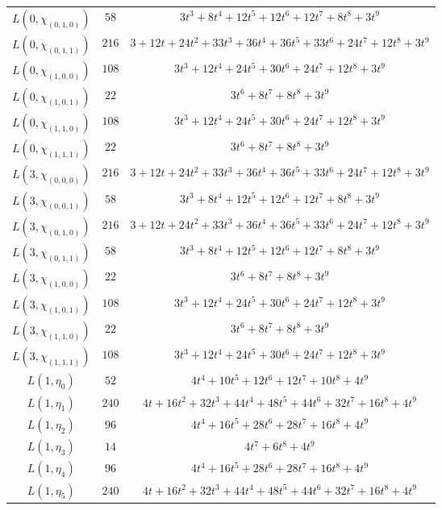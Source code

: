 \begin{center}
\begin{tabular}{c|c|c}
$L(0,\chi_{(0,1,0)})$ & $58$ & $3t^{3} + 8t^{4} + 12t^{5} + 12t^{6} + 12t^{7} + 8t^{8} + 3t^{9}$ \\
$L(0,\chi_{(0,1,1)})$ & $216$ & $3 + 12t + 24t^{2} + 33t^{3} + 36t^{4} + 36t^{5} + 33t^{6} + 24t^{7} + 12t^{8} + 3t^{9}$ \\
$L(0,\chi_{(1,0,0)})$ & $108$ & $3t^{3} + 12t^{4} + 24t^{5} + 30t^{6} + 24t^{7} + 12t^{8} + 3t^{9}$ \\
$L(0,\chi_{(1,0,1)})$ & $22$ & $3t^{6} + 8t^{7} + 8t^{8} + 3t^{9}$ \\
$L(0,\chi_{(1,1,0)})$ & $108$ & $3t^{3} + 12t^{4} + 24t^{5} + 30t^{6} + 24t^{7} + 12t^{8} + 3t^{9}$ \\
$L(0,\chi_{(1,1,1)})$ & $22$ & $3t^{6} + 8t^{7} + 8t^{8} + 3t^{9}$ \\
$L(3,\chi_{(0,0,0)})$ & $216$ & $3 + 12t + 24t^{2} + 33t^{3} + 36t^{4} + 36t^{5} + 33t^{6} + 24t^{7} + 12t^{8} + 3t^{9}$ \\
$L(3,\chi_{(0,0,1)})$ & $58$ & $3t^{3} + 8t^{4} + 12t^{5} + 12t^{6} + 12t^{7} + 8t^{8} + 3t^{9}$ \\
$L(3,\chi_{(0,1,0)})$ & $216$ & $3 + 12t + 24t^{2} + 33t^{3} + 36t^{4} + 36t^{5} + 33t^{6} + 24t^{7} + 12t^{8} + 3t^{9}$ \\
$L(3,\chi_{(0,1,1)})$ & $58$ & $3t^{3} + 8t^{4} + 12t^{5} + 12t^{6} + 12t^{7} + 8t^{8} + 3t^{9}$ \\
$L(3,\chi_{(1,0,0)})$ & $22$ & $3t^{6} + 8t^{7} + 8t^{8} + 3t^{9}$ \\
$L(3,\chi_{(1,0,1)})$ & $108$ & $3t^{3} + 12t^{4} + 24t^{5} + 30t^{6} + 24t^{7} + 12t^{8} + 3t^{9}$ \\
$L(3,\chi_{(1,1,0)})$ & $22$ & $3t^{6} + 8t^{7} + 8t^{8} + 3t^{9}$ \\
$L(3,\chi_{(1,1,1)})$ & $108$ & $3t^{3} + 12t^{4} + 24t^{5} + 30t^{6} + 24t^{7} + 12t^{8} + 3t^{9}$ \\
$L(1,\eta_{0})$ & $52$ & $4t^{4} + 10t^{5} + 12t^{6} + 12t^{7} + 10t^{8} + 4t^{9}$ \\
$L(1,\eta_{1})$ & $240$ & $4t + 16t^{2} + 32t^{3} + 44t^{4} + 48t^{5} + 44t^{6} + 32t^{7} + 16t^{8} + 4t^{9}$ \\
$L(1,\eta_{2})$ & $96$ & $4t^{4} + 16t^{5} + 28t^{6} + 28t^{7} + 16t^{8} + 4t^{9}$ \\
$L(1,\eta_{3})$ & $14$ & $4t^{7} + 6t^{8} + 4t^{9}$ \\
$L(1,\eta_{4})$ & $96$ & $4t^{4} + 16t^{5} + 28t^{6} + 28t^{7} + 16t^{8} + 4t^{9}$ \\
$L(1,\eta_{5})$ & $240$ & $4t + 16t^{2} + 32t^{3} + 44t^{4} + 48t^{5} + 44t^{6} + 32t^{7} + 16t^{8} + 4t^{9}$ \\

\end{tabular}
\end{center}
